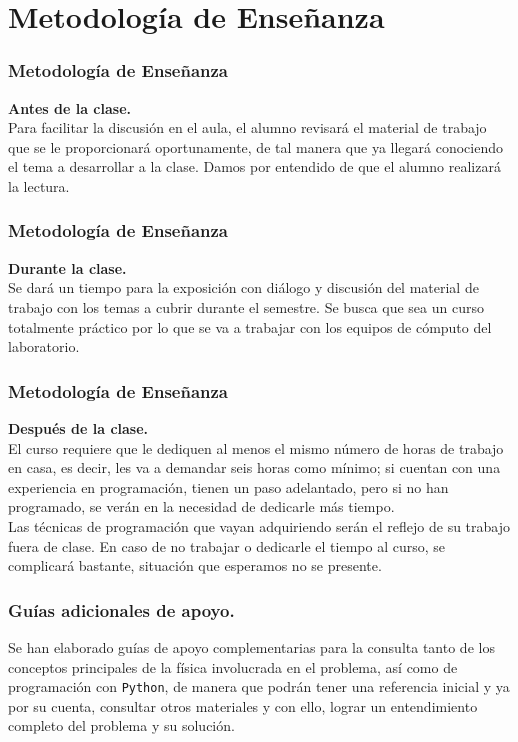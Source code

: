 \documentclass[12pt]{beamer}
\begin{document}
\section{Metodología de Enseñanza}
\begin{frame}
\frametitle{Metodología de Enseñanza}
\textbf{Antes de la clase.}
\\
\medskip
Para facilitar la discusión en el aula, el alumno revisará el material de trabajo que se le proporcionará oportunamente, de tal manera que ya llegará conociendo el tema a desarrollar a la clase. Damos por entendido de que el alumno realizará la lectura.
\end{frame}
\begin{frame}
\frametitle{Metodología de Enseñanza}
\textbf{Durante la clase.}
\\
\medskip
Se dará un tiempo para la exposición con diálogo y discusión del material de trabajo con los temas a cubrir durante el semestre. Se busca que sea un curso totalmente práctico por lo que se va a trabajar con los equipos de cómputo del laboratorio.
\end{frame}
\begin{frame}
\frametitle{Metodología de Enseñanza}
\textbf{Después de la clase.}
\\
\medskip
El curso requiere que le dediquen al menos el mismo número de horas de trabajo en casa, es decir, les va a demandar seis horas como mínimo; si cuentan con una experiencia en programación, tienen un paso adelantado, pero si no han programado, se verán en la necesidad de dedicarle más tiempo.
\\
\medskip
Las técnicas de programación que vayan adquiriendo serán el reflejo de su trabajo fuera de clase. En caso de no trabajar o dedicarle el tiempo al curso, se complicará bastante, situación que esperamos no se presente.
\end{frame}
\begin{frame}
\frametitle{Guías adicionales de apoyo.}
Se han elaborado guías de apoyo complementarias para la consulta tanto de los conceptos principales de la física involucrada en el problema, así como de programación con \texttt{Python}, de manera que podrán tener una referencia inicial y ya por su cuenta, consultar otros materiales y con ello, lograr un entendimiento completo del problema y su solución.
\end{frame}
\end{document}
